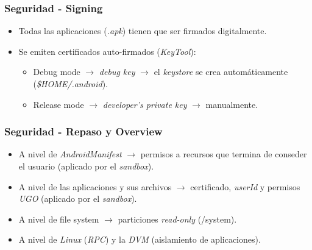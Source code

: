 \begin{frame}
  \frametitle{Seguridad - Signing}
  \begin{itemize}
    \item Todas las aplicaciones (\textit{.apk}) tienen que ser firmados digitalmente.

    \item Se emiten certificados auto-firmados (\textit{KeyTool}):
    \begin{itemize}
	\item Debug mode $\rightarrow$ \textit{debug key} $\rightarrow$ el \textit{keystore} se crea automáticamente (\textit{\$HOME/.android}).
	
	\item Release mode $\rightarrow$ \textit{developer's private key} $\rightarrow$ manualmente.
    \end{itemize}    
  \end{itemize}
\end{frame}

\begin{frame}
  \frametitle{Seguridad - Repaso y Overview}
  \begin{itemize}
   \item A nivel de \textit{AndroidManifest} $\rightarrow$ permisos a recursos que termina de conseder el usuario (aplicado por el \textit{sandbox}).
   
   \item A nivel de las aplicaciones y sus archivos $\rightarrow$ certificado, \textit{userId} y permisos \textit{UGO} (aplicado por el \textit{sandbox}).
   
   \item A nivel de file system $\rightarrow$ particiones \textit{read-only} (/system).
   
   \item A nivel de \textit{Linux} (\textit{RPC}) y la \textit{DVM} (aislamiento de aplicaciones).
  \end{itemize}
\end{frame}

